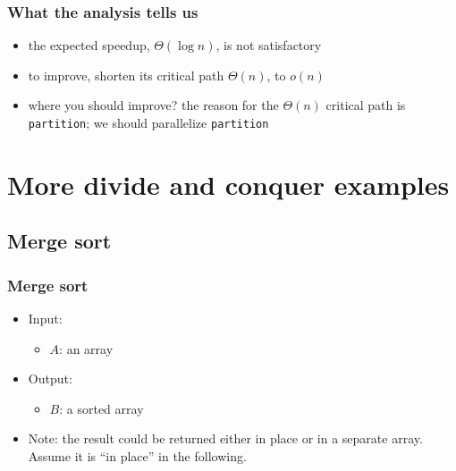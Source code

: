 \documentclass[12pt,dvipdfmx]{beamer}
\newcommand{\ao}[1]{{\color{blue}#1}}
\begin{document}
\begin{frame}
\frametitle{What the analysis tells us}
\begin{itemize}
\item the expected speedup, \ao{$\Theta(\log n)$}, is not satisfactory
\item to improve, shorten its critical path \ao{$\Theta(n)$}, to \ao{$o(n)$}
\item where you should improve? the reason for the $\Theta(n)$ critical path
  is \ao{\texttt{partition}}; we should parallelize \ao{\texttt{partition}}
\end{itemize}

\begin{center}
\def\svgwidth{0.7\textwidth}

\end{center}


\end{frame}


\section{More divide and conquer examples}

\subsection{Merge sort}

\begin{frame}
\frametitle{Merge sort}
\begin{itemize}
\item Input: 
  \begin{itemize}
  \item \ao{$A$}: an array
  \end{itemize}
\item Output:
  \begin{itemize}
  \item \ao{$B$}: a sorted array
  \end{itemize}
\item Note: the result could be returned either in place
  or in a separate array. Assume it is ``in place'' in the following.
\end{itemize}
\end{frame}
\end{document}
